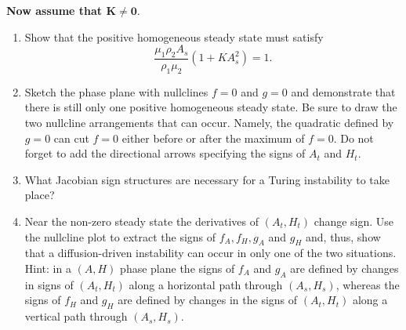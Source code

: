 \documentclass[10pt]{article}
\newcommand{\bb}{\begin{equation}}
\newcommand{\ee}{\end{equation}}
\newcounter{Counter1}
\begin{document}
\textbf{Now assume that $\bm{K\neq0}$}. 
\begin{enumerate}
\setcounter{enumi}{\value{Counter1}}
\item Show that the positive homogeneous steady state must satisfy
\bb
\frac{\mu_1\rho_2 A_s}{\rho_1\mu_2}(1+KA_s^2)=1.\label{Stst_criterion}
\ee

\item  Sketch the phase plane with nullclines $f=0$ and $g=0$ and demonstrate that there is still only one positive homogeneous steady state. Be sure to draw the two nullcline arrangements that can occur. Namely, the quadratic defined by $g=0$ can cut $f=0$ either before or after the maximum of $f=0$. Do not forget to add the directional arrows specifying the signs of $A_t$ and $H_t$.


\item What Jacobian sign structures are necessary for a Turing instability to take place?


\item Near the non-zero steady state the derivatives of $(A_t,H_t)$ change sign. Use the nullcline plot to extract the signs of $f_A, f_H, g_A$ and $g_H$ and, thus, show that a diffusion-driven instability can occur in only one of the two situations. Hint: in a $(A,H)$ phase plane the signs of  $f_A$ and $g_A$ are defined by changes in signs of $(A_t,H_t)$ along a horizontal path through $(A_s,H_s)$, whereas the signs of $f_H$ and $g_H$ are defined by changes in the signs of $(A_t,H_t)$ along a vertical path through $(A_s,H_s)$.
\end{enumerate}
\end{document}
